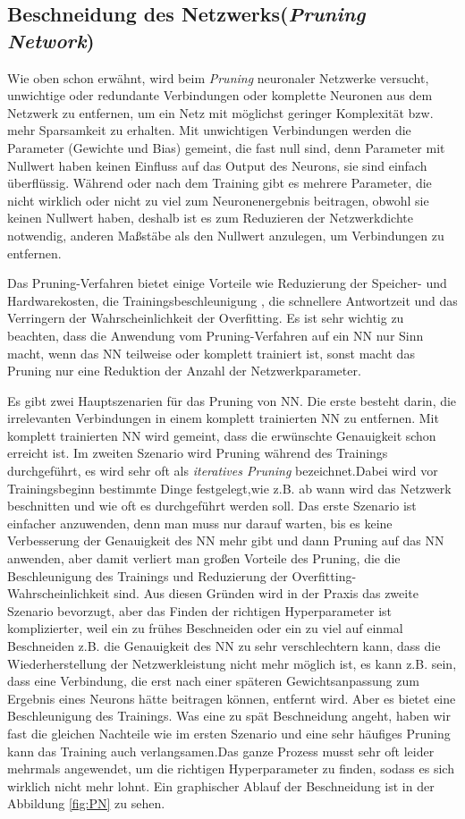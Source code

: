 \documentclass[12pt,a4paper]{scrartcl}
\numberwithin{equation}{section}
\begin{document}
\subsection{Beschneidung des Netzwerks(\textit{Pruning Network})}\label{kom:pruning}
Wie oben schon erwähnt, wird beim \textit{Pruning} neuronaler Netzwerke versucht, unwichtige oder redundante Verbindungen oder komplette Neuronen aus dem Netzwerk zu entfernen, um ein Netz mit möglichst geringer Komplexität bzw. mehr Sparsamkeit zu erhalten. Mit unwichtigen Verbindungen werden die Parameter (Gewichte und Bias) gemeint, die fast null sind, denn Parameter mit Nullwert haben keinen Einfluss auf das Output des Neurons, sie sind einfach überflüssig. Während oder nach dem Training gibt es mehrere Parameter, die nicht wirklich oder nicht zu viel zum Neuronenergebnis beitragen, obwohl sie keinen Nullwert haben, deshalb ist es zum Reduzieren der Netzwerkdichte notwendig, anderen Maßstäbe als den Nullwert anzulegen, um Verbindungen zu entfernen.

Das Pruning-Verfahren bietet einige Vorteile wie Reduzierung der Speicher- und Hardwarekosten, die Trainingsbeschleunigung , die schnellere Antwortzeit und das Verringern der Wahrscheinlichkeit der Overfitting.
Es ist sehr wichtig zu beachten, dass die Anwendung vom Pruning-Verfahren auf ein \ac{NN} nur Sinn macht, wenn das \ac{NN} teilweise oder komplett trainiert ist, sonst macht das Pruning nur eine Reduktion der Anzahl der Netzwerkparameter.

Es gibt zwei Hauptszenarien für das Pruning von \ac{NN}.
Die erste besteht darin, die irrelevanten Verbindungen in einem komplett trainierten \ac{NN} zu entfernen. Mit komplett trainierten \ac{NN} wird gemeint, dass die erwünschte Genauigkeit schon erreicht ist. Im zweiten Szenario wird Pruning während des Trainings durchgeführt, es wird sehr oft als \textit{iteratives Pruning} bezeichnet.Dabei wird vor Trainingsbeginn  bestimmte Dinge festgelegt,wie z.B. ab wann wird das Netzwerk beschnitten und wie oft es durchgeführt werden soll. 
Das erste Szenario ist einfacher anzuwenden, denn man muss nur darauf warten, bis es keine Verbesserung der Genauigkeit des \ac{NN} mehr gibt und dann Pruning auf das \ac{NN} anwenden, aber damit verliert man großen Vorteile des Pruning, die die Beschleunigung des Trainings und Reduzierung der Overfitting-Wahrscheinlichkeit sind.
Aus diesen Gründen wird in der Praxis das zweite Szenario bevorzugt, aber das Finden der richtigen Hyperparameter ist komplizierter, weil ein zu frühes Beschneiden oder ein zu viel auf einmal Beschneiden z.B. die Genauigkeit des \ac{NN} zu sehr verschlechtern kann, dass die Wiederherstellung der Netzwerkleistung nicht mehr möglich ist, es kann z.B. sein, dass eine Verbindung, die erst nach einer späteren Gewichtsanpassung zum Ergebnis eines Neurons hätte beitragen können, entfernt wird. Aber es bietet eine Beschleunigung des Trainings. Was eine zu spät Beschneidung angeht, haben wir fast die gleichen Nachteile wie im ersten Szenario und eine sehr häufiges Pruning kann das Training  auch verlangsamen.Das ganze Prozess musst sehr oft leider mehrmals angewendet, um die richtigen Hyperparameter zu finden, sodass es sich wirklich nicht mehr lohnt. Ein graphischer Ablauf der Beschneidung ist in der Abbildung \ref{fig:PN} zu sehen.
\end{document}
